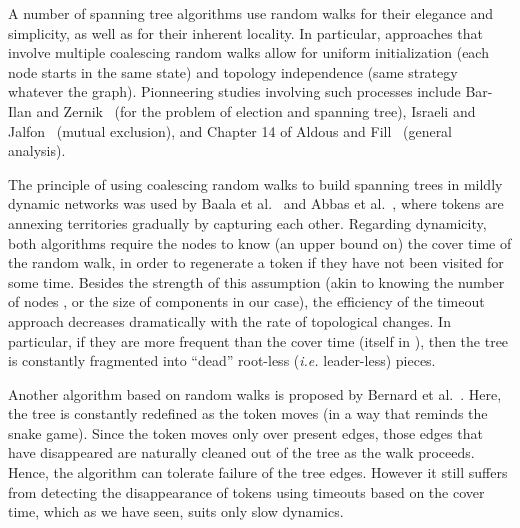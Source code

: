 \documentclass[twocolumn]{article}
\begin{document}
A number of spanning tree algorithms use random walks for their elegance and simplicity, as well as for their inherent locality. In particular, approaches that involve multiple coalescing random walks allow for uniform initialization (each node starts in the same state) and topology independence (same strategy whatever the graph). Pionneering studies involving such processes include Bar-Ilan and Zernik~\cite{BZ89} (for the problem of election and spanning tree), Israeli and Jalfon~\cite{IJ90} (mutual exclusion), and Chapter 14 of Aldous and Fill~\cite{AF02} (general analysis). 

The principle of using coalescing random walks to build spanning trees in mildly dynamic networks was used by Baala et al.~\cite{mosbah-tree} and Abbas et al.~\cite{Baala03}, where tokens are annexing territories gradually by capturing each other. Regarding dynamicity, both algorithms require the nodes to know (an upper bound on) the cover time of the random walk, in order to regenerate a token if they have not been visited for some time. Besides the strength of this assumption (akin to knowing the number of nodes , or the size of components in our case), the efficiency of the timeout approach decreases dramatically with the rate of topological changes. In particular, if they are more frequent than the cover time (itself in ), then the tree is constantly fragmented into ``dead'' root-less ({\it i.e.} leader-less) pieces.







Another algorithm based on random walks is proposed by Bernard et al.~\cite{BBS13}. Here, the tree is constantly redefined as the token moves (in a way that reminds the snake game). Since the token moves only over present edges, those edges that have disappeared are naturally cleaned out of the tree as the walk proceeds. Hence, the algorithm can tolerate failure of the tree edges. However it still suffers from detecting the disappearance of tokens using timeouts based on the cover time, which as we have seen, suits only slow dynamics.
\end{document}
